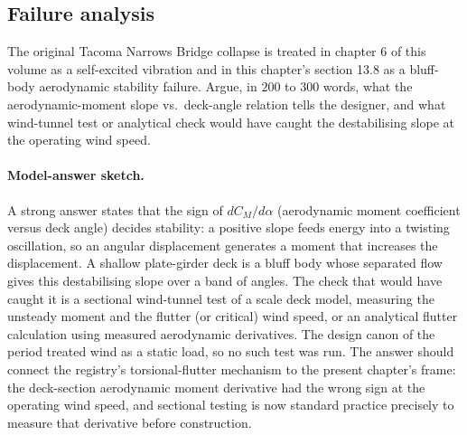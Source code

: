 \subsection*{Failure analysis}

\begin{exercise}
The original Tacoma Narrows Bridge collapse
\cite{acc:tacoma-narrows-1941} is treated in chapter 6 of this volume as a
self-excited vibration and in this chapter's section 13.8 as a
bluff-body aerodynamic stability failure. Argue, in $200$ to
$300$ words, what the aerodynamic-moment slope vs.\ deck-angle
relation tells the designer, and what wind-tunnel test or
analytical check would have caught the destabilising slope at
the operating wind speed.
\paragraph{Model-answer sketch.} A strong answer states that the sign
of $dC_M/d\alpha$ (aerodynamic moment coefficient versus deck angle)
decides stability: a positive slope feeds energy into a twisting
oscillation, so an angular displacement generates a moment that
increases the displacement. A shallow plate-girder deck is a bluff
body whose separated flow gives this destabilising slope over a band
of angles. The check that would have caught it is a sectional
wind-tunnel test of a scale deck model, measuring the unsteady moment
and the flutter (or critical) wind speed, or an analytical flutter
calculation using measured aerodynamic derivatives. The design canon
of the period treated wind as a static load, so no such test was run.
The answer should connect the registry's torsional-flutter mechanism
to the present chapter's frame: the deck-section aerodynamic moment
derivative had the wrong sign at the operating wind speed, and
sectional testing is now standard practice precisely to measure that
derivative before construction.
\end{exercise}

